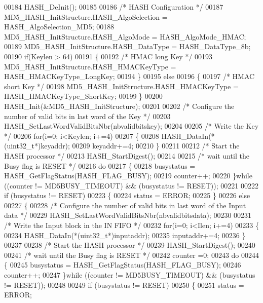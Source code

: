 \begin{DoxyCode}
00184   HASH_DeInit();
00185 
00186   \textcolor{comment}{/* HASH Configuration */}
00187   MD5\_HASH\_InitStructure.HASH\_AlgoSelection = HASH_AlgoSelection_MD5;
00188   MD5\_HASH\_InitStructure.HASH\_AlgoMode = HASH_AlgoMode_HMAC;
00189   MD5\_HASH\_InitStructure.HASH\_DataType = HASH_DataType_8b;
00190   \textcolor{keywordflow}{if}(Keylen > 64)
00191   \{
00192     \textcolor{comment}{/* HMAC long Key */}
00193     MD5\_HASH\_InitStructure.HASH\_HMACKeyType = HASH_HMACKeyType_LongKey;
00194   \}
00195   \textcolor{keywordflow}{else}
00196   \{
00197     \textcolor{comment}{/* HMAC short Key */}
00198     MD5\_HASH\_InitStructure.HASH\_HMACKeyType = HASH_HMACKeyType_ShortKey;
00199   \}
00200   HASH_Init(&MD5\_HASH\_InitStructure);
00201 
00202   \textcolor{comment}{/* Configure the number of valid bits in last word of the Key */}
00203   HASH\_SetLastWordValidBitsNbr(nbvalidbitskey);
00204 
00205   \textcolor{comment}{/* Write the Key */}
00206   \textcolor{keywordflow}{for}(i=0; i<Keylen; i+=4)
00207   \{
00208     HASH\_DataIn(*(uint32\_t*)keyaddr);
00209     keyaddr+=4;
00210   \}
00211 
00212   \textcolor{comment}{/* Start the HASH processor */}
00213   HASH_StartDigest();
00214 
00215   \textcolor{comment}{/* wait until the Busy flag is RESET */}
00216   \textcolor{keywordflow}{do}
00217   \{
00218     busystatus = HASH\_GetFlagStatus(HASH_FLAG_BUSY);
00219     counter++;
00220   \}\textcolor{keywordflow}{while} ((counter != MD5BUSY_TIMEOUT) && (busystatus != RESET));
00221 
00222   \textcolor{keywordflow}{if} (busystatus != RESET)
00223   \{
00224      status = ERROR;
00225   \}
00226   \textcolor{keywordflow}{else}
00227   \{
00228     \textcolor{comment}{/* Configure the number of valid bits in last word of the Input data */}
00229     HASH\_SetLastWordValidBitsNbr(nbvalidbitsdata);
00230 
00231     \textcolor{comment}{/* Write the Input block in the IN FIFO */}
00232     \textcolor{keywordflow}{for}(i=0; i<Ilen; i+=4)
00233     \{
00234       HASH\_DataIn(*(uint32\_t*)inputaddr);
00235       inputaddr+=4;
00236     \}
00237 
00238     \textcolor{comment}{/* Start the HASH processor */}
00239     HASH\_StartDigest();
00240 
00241     \textcolor{comment}{/* wait until the Busy flag is RESET */}
00242     counter =0;
00243     \textcolor{keywordflow}{do}
00244     \{
00245        busystatus = HASH\_GetFlagStatus(HASH_FLAG_BUSY);
00246        counter++;
00247     \}\textcolor{keywordflow}{while} ((counter != MD5BUSY_TIMEOUT) && (busystatus != RESET));
00248 
00249     \textcolor{keywordflow}{if} (busystatus != RESET)
00250     \{
00251       status = ERROR;

\end{DoxyCode}
